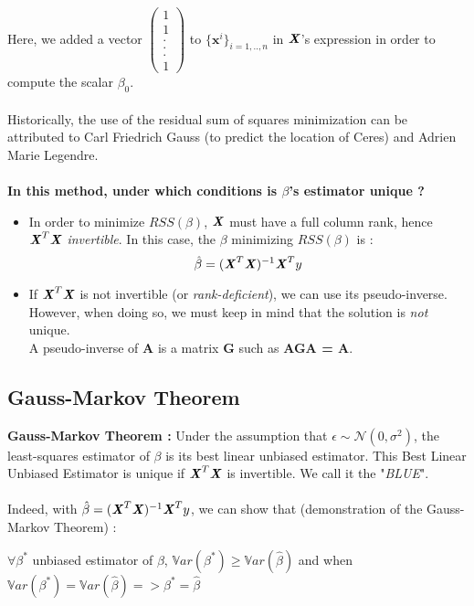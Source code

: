 \documentclass[a4paper,12pt]{article}
\newcommand{\xx}{{\bm x}}
\begin{document}
Here, we added a vector \(\left( \begin{array}{c}
1 \\
1 \\
.\\
. \\
. \\
1 \end{array} \right)\) to \({\{\xx^i\}}_{\textit{i}=1,..,\textit{n}}\) in  \(\textbf{\textit{X}}\)'s expression in order to compute the scalar \(\beta_0\). \\
\\ 
Historically, the use of the residual sum of squares minimization can be attributed to Carl Friedrich Gauss (to predict the location of Ceres) and Adrien Marie Legendre. 
\\
\\
\textbf{In this method, under which conditions is \(\beta\)'s estimator unique ? }
\\

\begin{itemize}
\item 
In order to minimize \(RSS(\beta)\), \(\textbf{\textit{X}}\) must have a full column rank, hence \(\textbf{\textit{X}}^T\textbf{\textit{X}}\) \textit{invertible}. In this case, the \(\beta\) minimizing \(RSS(\beta)\) is : 
\[\hat{\beta} = (\textbf{\textit{X}}^T\textbf{\textit{X}})^{-1} \textbf{\textit{X}}^T y\]
\item 
If \(\textbf{\textit{X}}^T\textbf{\textit{X}}\) is not invertible (or \textit{rank-deficient}), we can use its pseudo-inverse. However, when doing so, we must keep in mind that the solution is \textit{not} unique. \\ A pseudo-inverse of\textbf{ A} is a matrix \textbf{G} such as \textbf{AGA = A}.
\end{itemize}
 


\subsection{Gauss-Markov Theorem}

\textbf{Gauss-Markov Theorem :} Under the assumption that \(\epsilon\sim{}\mathcal{N}(0,{\sigma}^2)\), the least-squares estimator of \(\beta\) is its best linear unbiased estimator. This Best Linear Unbiased Estimator is unique if \(\textbf{\textit{X}}^T\textbf{\textit{X}}\) is invertible. We call it the "\textit{BLUE}". 
\\
\\
Indeed, with \(\hat{\beta} = (\textbf{\textit{X}}^T\textbf{\textit{X}})^{-1} \textbf{\textit{X}}^T y\), we can show that (demonstration of the Gauss-Markov Theorem) : 
\begin{center}
\(\forall \beta^*\) unbiased estimator of \(\beta\), \(\mathbb{V}ar(\beta^*) \geq \mathbb{V}ar(\hat{\beta})\) and when \(\mathbb{V}ar(\beta^*) = \mathbb{V}ar(\hat{\beta}) => \beta^* = \hat{\beta} \)
\end{center}
\vspace{1cm}
\end{document}
